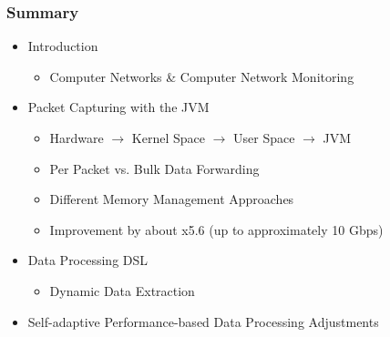 \documentclass[aspectratio=169]{beamer}
\begin{document}
  \begin{frame}
      \frametitle{Summary}

    \begin{itemize}
        \item Introduction
            \begin{itemize}
                \item Computer Networks \& Computer Network Monitoring
            \end{itemize}
        \item Packet Capturing with the JVM
            \begin{itemize}
                \item Hardware $\rightarrow$ Kernel Space $\rightarrow$ User Space $\rightarrow$ JVM
                \item Per Packet vs. Bulk Data Forwarding
                \item Different Memory Management Approaches
                \item Improvement by about x5.6 (up to approximately 10 Gbps)
            \end{itemize}
        \item Data Processing DSL
            \begin{itemize}
                \item Dynamic Data Extraction
            \end{itemize}
        \item Self-adaptive Performance-based Data Processing Adjustments
    \end{itemize}
  \end{frame}
\end{document}

